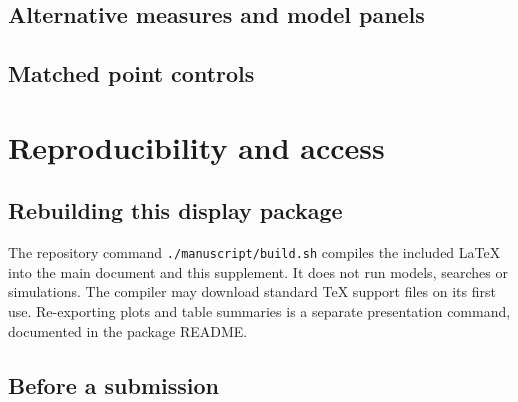 \documentclass[12pt]{article}
\begin{document}
\subsection{Alternative measures and model panels}

\clearpage
\subsection{Matched point controls}

\clearpage

\section{Reproducibility and access}

\subsection{Rebuilding this display package}
The repository command \nolinkurl{./manuscript/build.sh} compiles the included LaTeX into the main document and this supplement. It does not run models, searches or simulations. The compiler may download standard TeX support files on its first use. Re-exporting plots and table summaries is a separate presentation command, documented in the package README.

\subsection{Before a submission}
\end{document}
